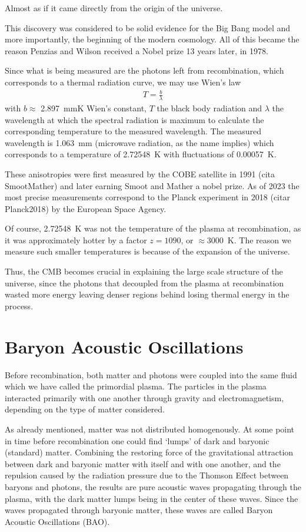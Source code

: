 Almost as if it came directly from the origin of the universe.

This discovery was considered to be solid evidence for the Big Bang model and more importantly, the beginning of the modern cosmology. All of this became the reason Penzias and Wilson received a Nobel prize 13 years later, in 1978.

Since what is being measured are the photons left from recombination, which corresponds to a thermal radiation curve, we may use Wien's law 
\begin{align}
	T = \frac{b}{\lambda}
\end{align}
with $b\approx $ \SI{2.897}{mmK} Wien's constant, $T$ the black body radiation and $\lambda$ the wavelength at which the spectral radiation is maximum to calculate the corresponding temperature to the measured wavelength. The measured wavelength is \SI{1.063}{mm} (microwave radiation, as the name implies) which corresponds to a temperature of \SI{2.72548}{K} with fluctuations of \SI{0.00057}{K}. 

These anisotropies were first measured by the COBE satellite in 1991 (cita SmootMather) and later earning Smoot and Mather a nobel prize. As of 2023 the most precise measurements correspond to the Planck experiment in 2018 (citar Planck2018) by the European Space Agency.

Of course, \SI{2.72548}{K} was not the temperature of the plasma at recombination, as it was approximately hotter by a factor $z=1090$, or $\approx$\SI{3000}{K}. The reason we measure such smaller temperatures is because of the expansion of the universe.

Thus, the CMB becomes crucial in explaining the large scale structure of the universe, since the photons that decoupled from the plasma at recombination wasted more energy leaving denser regions behind losing thermal energy in the process. 

\section{Baryon Acoustic Oscillations}

Before recombination, both matter and photons were coupled into the same fluid which we have called the primordial plasma. The particles in the plasma interacted primarily with one another through gravity and electromagnetism, depending on the type of matter considered. 

As already mentioned, matter was not distributed homogenously. At some point in time before recombination one could find `lumps' of dark and baryonic (standard) matter. Combining the restoring force of the gravitational attraction between dark and baryonic matter with itself and with one another, and the repulsion caused by the radiation pressure due to the Thomson Effect between baryons and photons, the results are pure acoustic waves propagating through the plasma, with the dark matter lumps being in the center of these waves. Since the waves propagated through baryonic matter, these waves are called Baryon Acoustic Oscillations (BAO).

